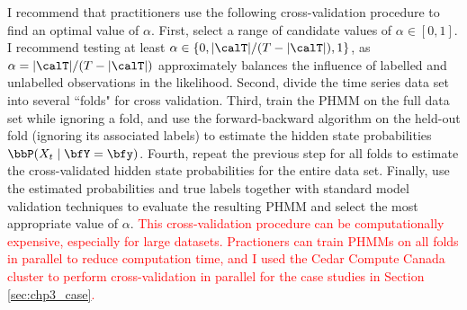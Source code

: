 I recommend that practitioners use the following cross-validation procedure to find an optimal value of $\alpha$. First, select a range of candidate values of $\alpha \in [0,1]$. I recommend testing at least $\alpha \in \{0,|\calT| / (T - |\calT|), 1\}$, as $\alpha = |\calT| / (T - |\calT|)$ approximately balances the influence of labelled and unlabelled observations in the likelihood. Second, divide the time series data set into several ``folds" for cross validation. Third, train the PHMM on the full data set while ignoring a fold, and use the forward-backward algorithm on the held-out fold (ignoring its associated labels) to estimate the hidden state probabilities $\bbP(X_t \mid \bfY = \bfy)$. Fourth, repeat the previous step for all folds to estimate the cross-validated hidden state probabilities for the entire data set. Finally, use the estimated probabilities and true labels together with standard model validation techniques to evaluate the resulting PHMM and select the most appropriate value of $\alpha$. \textcolor{red}{This cross-validation procedure can be computationally expensive, especially for large datasets. Practioners can train PHMMs on all folds in parallel to reduce computation time, and I used the Cedar Compute Canada cluster to perform cross-validation in parallel for the case studies in Section \ref{sec:chp3_case}.} %
